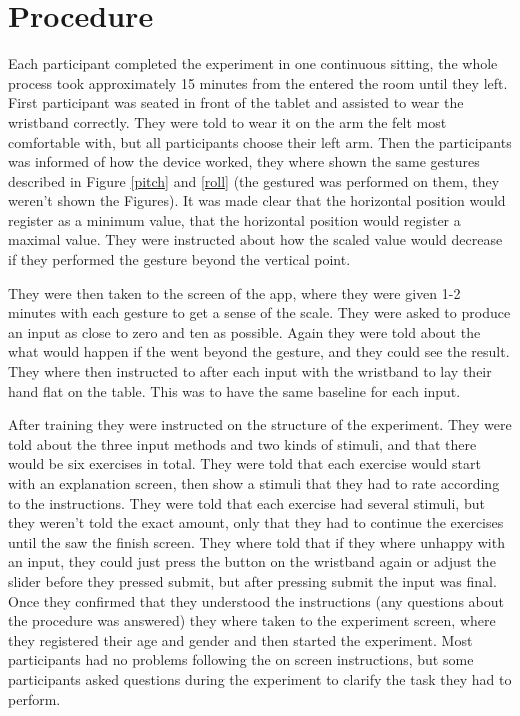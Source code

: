 \section{Procedure}
Each participant completed the experiment in one continuous sitting, the whole process took approximately 15 minutes from the entered the room until they left. First participant was seated in front of the tablet and assisted to wear the wristband correctly. They were told to wear it on the arm the felt most comfortable with, but all participants choose their left arm. Then the participants was informed of how the device worked, they where shown the same gestures described in Figure \ref{pitch} and \ref{roll} (the gestured was performed on them, they weren't shown the Figures). It was made clear that the horizontal position would register as a minimum value, that the horizontal position would register a maximal value. They were instructed about how the scaled value would decrease if they performed the gesture beyond the vertical point.

They were then taken to the  screen of the app, where they were given 1-2 minutes with each gesture to get a sense of the scale. They were asked to produce an input as close to zero and ten as possible. Again they were told about the what would happen if the went beyond the gesture, and they could see the result. They where then instructed to after each input with the wristband to lay their hand flat on the table. This was to have the same baseline for each input.

After training they were instructed on the structure of the experiment. They were told about the three input methods and two kinds of stimuli, and that there would be six exercises in total. They were told that each exercise would start with an explanation screen, then show a stimuli that they had to rate according to the instructions. They were told that each exercise had several stimuli, but they weren't told the exact amount, only that they had to continue the exercises until the saw the finish screen. They where told that if they where unhappy with an input, they could just press the button on the wristband again or adjust the slider before they pressed submit, but after pressing submit the input was final. Once they confirmed that they understood the instructions (any questions about the procedure was answered) they where taken to the experiment screen, where they registered their age and gender and then started the experiment. Most participants had no problems following the on screen instructions, but some participants asked questions during the experiment to clarify the task they had to perform. 

